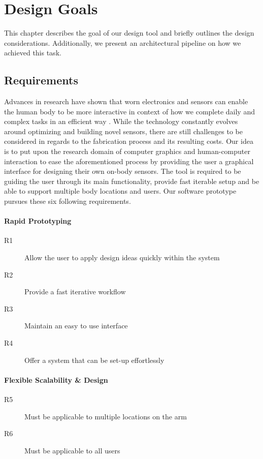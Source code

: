 
%
%

\sectionfix
\section{Design Goals}
\label{sec:goals}
This chapter describes the goal of our design tool and briefly outlines the design considerations. Additionally, we present an architectural pipeline on how we achieved this task. 
\subsection{Requirements}
Advances in research have shown that worn electronics and sensors can enable the human body to be more interactive in context of how we complete daily and complex tasks in an efficient way \cite{Amft:2008:RDA:1343127.1343441}. While the technology constantly evolves around optimizing and building novel sensors, there are still challenges to be considered in regards to the fabrication process and its resulting costs. Our idea is to put upon the research domain of computer graphics and human-computer interaction to ease the aforementioned process by providing the user a graphical interface for designing their own on-body sensors. The tool is required to be guiding the user through its main functionality, provide fast iterable setup and be able to support multiple body locations and users. Our software prototype pursues these six following requirements.
\raggedbottom
\paragraph*{Rapid Prototyping}
\begin{description}
\item[R1] Allow the user to apply design ideas quickly within the system
\item[R2] Provide a fast iterative workflow
\item[R3] Maintain an easy to use interface
\item[R4] Offer a system that can be set-up effortlessly
\end{description}

\paragraph*{Flexible Scalability \& Design}  
\begin{description}
\item[R5] Must be applicable to multiple locations on the arm
\item[R6] Must be applicable to all users \\[3.25ex]
\end{description}

